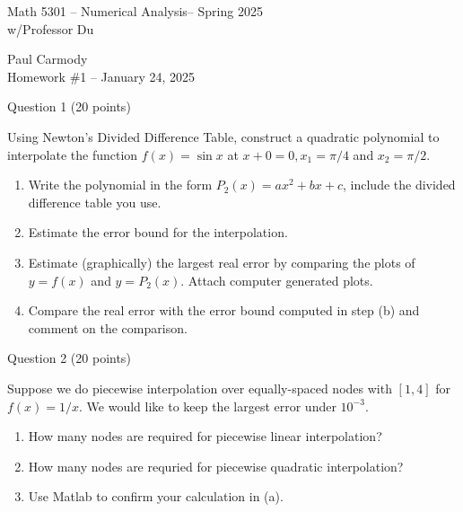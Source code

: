 \documentclass[10pt,a4paper]{report}
\newcommand{\CLASSNAME}{Math 5301 -- Numerical Analysis}
\newcommand{\STUDENTNAME}{Paul Carmody}
\newcommand{\ASSIGNMENT}{Homework \#1 }
\newcommand{\DUEDATE}{January 24, 2025}
\newcommand{\SEMESTER}{Spring 2025}
\begin{document}
\begin{center}
	\Large{\CLASSNAME -- \SEMESTER} \\
	\large{ w/Professor Du}
\end{center}
\begin{center}
	\STUDENTNAME \\
	\ASSIGNMENT -- \DUEDATE\\
\end{center} 

Question 1 (20 points)
\vspace{1 em}

Using Newton's Divided Difference Table, construct a quadratic polynomial to interpolate the function $f(x) = \sin x$ at $x+0=0, x_1=\pi/4$ and $x_2=\pi/2$.
\begin{enumerate}[label=(\alph*)]

	\item Write the polynomial in the form $P_2(x)=ax^2+bx+c$, include the divided difference table you use.
	\item Estimate the error bound for the interpolation.
	\item Estimate (graphically) the largest real error by comparing the plots of $y=f(x)$ and $y=P_2(x)$.  Attach computer generated plots.
	\item Compare the real error with the error bound computed in step (b) and comment on the comparison.

\end{enumerate}
\vspace{1 em}

Question 2 (20 points)
\vspace{1 em}

Suppose we do piecewise interpolation over equally-spaced nodes with $[1,4]$ for $f(x)=1/x$.  We would like to keep the largest error under $10^{-3}$.

\begin{enumerate}[label=(\alph*)]

	\item How many nodes are required for piecewise linear interpolation?
	
	\item How many nodes are requried for piecewise quadratic interpolation?
	
	\item Use Matlab to confirm your calculation in (a).

\end{enumerate}
\end{document}
